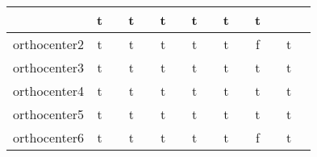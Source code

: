 {\begin{longtable}{|l|*{7}{cr|}}
& \cellcolor{green!40}t & \cellcolor{green!40}{ 105} 
& \cellcolor{green!50}t & \cellcolor{green!50}{ 46} 
& \cellcolor{green!30}t & \cellcolor{green!30}{\sl 248} 
& \cellcolor{green!30}t & \cellcolor{green!30}{ 191} 
& \cellcolor{green!40}t & \cellcolor{green!40}{ 77} 
& \cellcolor{green!60}t & \cellcolor{green!60}{ 12} 
\\ \hline
\cellcolor{blue!10}orthocenter2 
& \cellcolor{green!60}t & \cellcolor{green!60}{\bf 10} 
& \cellcolor{green!50}t & \cellcolor{green!50}{ 30} 
& \cellcolor{green!50}t & \cellcolor{green!50}{ 40} 
& \cellcolor{green!30}t & \cellcolor{green!30}{\sl 237} 
& \cellcolor{green!40}t & \cellcolor{green!40}{ 104} 
& \cellcolor{red!25}f & \cellcolor{red!25}{ 659} 
& \cellcolor{green!60}t & \cellcolor{green!60}{ 7} 
\\ \hline
\cellcolor{blue!10}orthocenter3 
& \cellcolor{green!60}t & \cellcolor{green!60}{\bf 7} 
& \cellcolor{green!50}t & \cellcolor{green!50}{ 31} 
& \cellcolor{green!40}t & \cellcolor{green!40}{ 53} 
& \cellcolor{green!30}t & \cellcolor{green!30}{\sl 257} 
& \cellcolor{green!40}t & \cellcolor{green!40}{ 125} 
& \cellcolor{green!40}t & \cellcolor{green!40}{ 75} 
& \cellcolor{green!60}t & \cellcolor{green!60}{ 6} 
\\ \hline
\cellcolor{blue!10}orthocenter4 
& \cellcolor{green!60}t & \cellcolor{green!60}{\bf 6} 
& \cellcolor{green!50}t & \cellcolor{green!50}{ 32} 
& \cellcolor{green!50}t & \cellcolor{green!50}{ 39} 
& \cellcolor{green!30}t & \cellcolor{green!30}{\sl 249} 
& \cellcolor{green!40}t & \cellcolor{green!40}{ 126} 
& \cellcolor{green!40}t & \cellcolor{green!40}{ 69} 
& \cellcolor{green!60}t & \cellcolor{green!60}{ 8} 
\\ \hline
\cellcolor{blue!10}orthocenter5 
& \cellcolor{green!60}t & \cellcolor{green!60}{\bf 12} 
& \cellcolor{green!40}t & \cellcolor{green!40}{ 68} 
& \cellcolor{green!40}t & \cellcolor{green!40}{ 106} 
& \cellcolor{green!30}t & \cellcolor{green!30}{\sl 274} 
& \cellcolor{green!40}t & \cellcolor{green!40}{ 116} 
& \cellcolor{green!40}t & \cellcolor{green!40}{ 132} 
& \cellcolor{green!60}t & \cellcolor{green!60}{ 11} 
\\ \hline
\cellcolor{blue!10}orthocenter6 
& \cellcolor{green!60}t & \cellcolor{green!60}{\bf 11} 
& \cellcolor{green!50}t & \cellcolor{green!50}{ 30} 
& \cellcolor{green!40}t & \cellcolor{green!40}{ 54} 
& \cellcolor{green!30}t & \cellcolor{green!30}{\sl 241} 
& \cellcolor{green!40}t & \cellcolor{green!40}{ 107} 
& \cellcolor{red!25}f & \cellcolor{red!25}{ 675} 
& \cellcolor{green!60}t & \cellcolor{green!60}{ 13} 

\end{longtable}}
